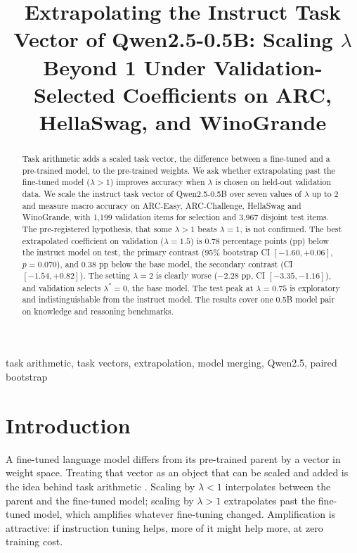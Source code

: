 \documentclass[conference]{IEEEtran}
\begin{document}
\title{Extrapolating the Instruct Task Vector of Qwen2.5-0.5B: Scaling $\lambda$ Beyond 1 Under Validation-Selected Coefficients on ARC, HellaSwag, and WinoGrande}

\author{
}

\maketitle

\begin{abstract}
Task arithmetic adds a scaled task vector, the difference between a fine-tuned and a pre-trained model, to the pre-trained weights. We ask whether extrapolating past the fine-tuned model ($\lambda>1$) improves accuracy when $\lambda$ is chosen on held-out validation data. We scale the instruct task vector of Qwen2.5-0.5B over seven values of $\lambda$ up to 2 and measure macro accuracy on ARC-Easy, ARC-Challenge, HellaSwag and WinoGrande, with 1{,}199 validation items for selection and 3{,}967 disjoint test items. The pre-registered hypothesis, that some $\lambda>1$ beats $\lambda=1$, is not confirmed. The best extrapolated coefficient on validation ($\lambda=1.5$) is $0.78$ percentage points (pp) below the instruct model on test, the primary contrast (95\% bootstrap CI $[-1.60,+0.06]$, $p=0.070$), and $0.38$ pp below the base model, the secondary contrast (CI $[-1.54,+0.82]$). The setting $\lambda=2$ is clearly worse ($-2.28$ pp, CI $[-3.35,-1.16]$), and validation selects $\lambda^\ast=0$, the base model. The test peak at $\lambda=0.75$ is exploratory and indistinguishable from the instruct model. The results cover one 0.5B model pair on knowledge and reasoning benchmarks.
\end{abstract}

\begin{IEEEkeywords}
task arithmetic, task vectors, extrapolation, model merging, Qwen2.5, paired bootstrap
\end{IEEEkeywords}

\section{Introduction}
A fine-tuned language model differs from its pre-trained parent by a vector in weight space. Treating that vector as an object that can be scaled and added is the idea behind task arithmetic \cite{ilharco2022editing}. Scaling by $\lambda<1$ interpolates between the parent and the fine-tuned model; scaling by $\lambda>1$ extrapolates past the fine-tuned model, which amplifies whatever fine-tuning changed. Amplification is attractive: if instruction tuning helps, more of it might help more, at zero training cost.
\end{document}
